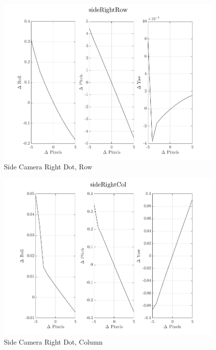 \documentclass[12pt]{article}
\begin{document}
\begin{multicols}{2}
\begin{figure}[H]
	\includegraphics[width=0.9\columnwidth]{sideRightRow.png}
	\caption{Side Camera Right Dot, Row\label{fig:sideRightRow}}
\end{figure}

\begin{figure}[H]
	\includegraphics[width=0.9\columnwidth]{sideRightCol.png}
	\caption{Side Camera Right Dot, Column\label{fig:sideRightCol}}
\end{figure}



\end{multicols}
\end{document}
